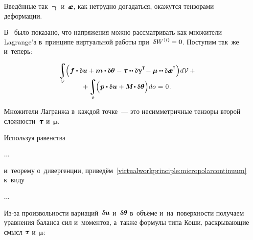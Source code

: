 \begin{otherlanguage}{russian}
\vspace{-0.55em} Введённые так $\bm{\upgamma}$ и~$\mathboldae$, как нетрудно догадаться, окажутся тензорами деформации.

В~ было показано, что напряжения можно рассматривать как множители Lagrange’а в~принципе виртуальной работы при~${\variation{\internalwork} = 0}$. Поступим так~же и~теперь:

\nopagebreak\vspace{-0.33em}
\begin{multline}\label{virtualworkprinciple:micropolarcontinuum}
\integral\displaylimits_{\mathcal{V}} \hspace{-0.64ex} \left(^{\mathstrut} \bm{f} \dotp \variation{\bm{u}} + \bm{m} \dotp \variation{\bm{\theta}} - \mathboldtau \dotdotp \variation{\bm{\upgamma}}^{\hspace{-0.05ex}\T} \hspace{-0.4ex} - \bm{\mu} \dotdotp \variation{\mathboldae}^{\T} \hspace{-0.05ex} \right) \hspace{-0.32ex} d\mathcal{V} \hspace{0.4ex} + \\[-1em]
+ \integral\displaylimits_o \hspace{-0.64ex} \left(^{\mathstrut} \bm{p} \dotp \variation{\bm{u}} + \mathboldM \hspace{-0.1ex} \dotp \variation{\bm{\theta}} \right) \hspace{-0.32ex} do \hspace{0.12ex} = \hspace{0.1ex} 0 \hspace{0.1ex}.
\end{multline}

\vspace{-0.2em} \noindent Множители Лагранжа в~каждой точке~--- это несимметричные тензоры второй сложности~$\mathboldtau$ и~$\bm{\mu}$.

Используя равенства

...

\noindent и~теорему о~дивергенции, приведём~\eqref{virtualworkprinciple:micropolarcontinuum} к~виду

...

Из\hbox{-}за произвольности вариаций~$\variation{\bm{u}}$ и~$\variation{\bm{\theta}}$ в~объёме и~на~поверхности получаем уравнения баланса сил и~моментов, а~также формулы типа Коши, %
раскрывающие смысл $\mathboldtau$ и~$\bm{\mu}$:


\end{otherlanguage}
